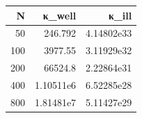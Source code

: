 \begin{tabular}{rrr}
  \toprule
  \textbf{N} & \textbf{κ\_well} & \textbf{κ\_ill} \\
  \midrule
  50 & 246.792 & 4.14802e33 \\
  100 & 3977.55 & 3.11929e32 \\
  200 & 66524.8 & 2.22864e31 \\
  400 & 1.10511e6 & 6.52285e28 \\
  800 & 1.81481e7 & 5.11427e29 \\
  \bottomrule
\end{tabular}
